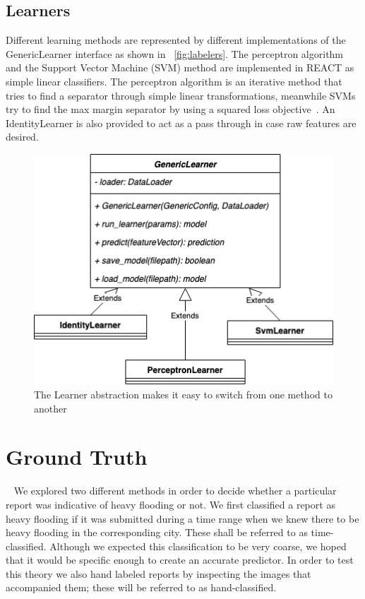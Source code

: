\subsection{Learners}
Different learning methods are represented by different implementations of
the GenericLearner interface as shown in
\figureautorefname{}~\ref{fig:labelers}. The perceptron algorithm and the
Support Vector Machine (SVM) method are implemented in REACT as simple linear
classifiers. The perceptron algorithm is an iterative method that tries to find
a separator through simple linear transformations, meanwhile SVMs try to find
the max margin separator by using a squared loss
objective~\cite{bishopPatternRecognitionMachine2006}. An IdentityLearner is also
provided to act as a pass through in case raw features are desired.
\begin{figure}[ht]
    \centering
    \includegraphics[scale=0.6]{images/learners.png}
    \caption{The Learner abstraction makes it easy to switch from one method to another}\label{fig:learners}
\end{figure}

\section{Ground Truth}~\label{chap4:ground_truth}
We explored two different methods in order to decide whether a particular report
was indicative of heavy flooding or not. We first classified a report as heavy
flooding if it was submitted during a time range when we knew there to be heavy 
flooding in the corresponding city. These shall be referred to as time-classified.
Although we expected this classification to be very coarse, we hoped that it would
be specific enough to create an accurate predictor. In order to test this theory 
we also hand labeled reports by inspecting the images that accompanied them; these
will be referred to as hand-classified. 

